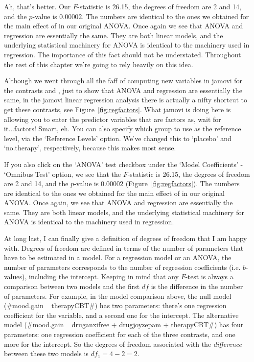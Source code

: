 Ah, that's better. Our $F$-statistic is 26.15, the degrees of freedom are 2 and 14, and the $p$-value is $0.00002$. The numbers are identical to the ones we obtained for the main effect of  in our original ANOVA. Once again we see that ANOVA and regression are essentially the same. They are both linear models, and the underlying statistical machinery for ANOVA is identical to the machinery used in regression. The importance of this fact should not be understated. Throughout the rest of this chapter we're going to rely heavily on this idea. 

Although we went through all the faff of computing new variables in jamovi for the contrasts  and , just to show that ANOVA and regression are essentially the same, in the jamovi linear regression analysis there is actually a nifty shortcut to get these contrasts, see Figure~\ref{fig:regfactors}. What jamovi is doing here is allowing you to enter the predictor variables that are factors as, wait for it...factors! Smart, eh. You can also specify which group to use as the reference level, via the `Reference Levels' option. We've changed this to `placebo' and `no.therapy', respectively, because this makes most sense. 

If you also click on the `ANOVA' test checkbox under the `Model Coefficients' - `Omnibus Test' option, we see that the $F$-statistic is 26.15, the degrees of freedom are 2 and 14, and the $p$-value is $0.00002$ (Figure~\ref{fig:regfactors}). The numbers are identical to the ones we obtained for the main effect of  in our original ANOVA. Once again, we see that ANOVA and regression are essentially the same. They are both linear models, and the underlying statistical machinery for ANOVA is identical to the machinery used in regression. 


At long last, I can finally give a definition of degrees of freedom that I am happy with. Degrees of freedom are defined in terms of the number of parameters that have to be estimated in a model. For a regression model or an ANOVA, the number of parameters corresponds to the number of regression coefficients (i.e. $b$-values), including the intercept. Keeping in mind that any $F$-test is always a comparison between two models and the first $df$ is the difference in the number of parameters. For example, in the model comparison above, the null model (\rtextverb#mood.gain ~ therapyCBT#) has two parameters: there's one regression coefficient for the  variable, and a second one for the intercept. The  alternative model (\rtextverb#mood.gain ~ druganxifree + drugjoyzepam + therapyCBT#) has four parameters: one regression coefficient for each of the three contrasts, and one more for the intercept. So the degrees of freedom associated with the {\it difference} between these two models is $df_1 = 4-2 = 2$. 


